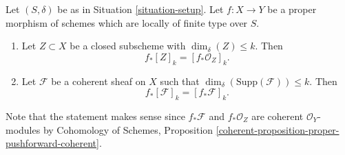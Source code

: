 \begin{lemma}
\label{lemma-cycle-push-sheaf}
Let $(S, \delta)$ be as in Situation \ref{situation-setup}.
Let $f : X \to Y$ be a proper morphism of schemes which are
locally of finite type over $S$.
\begin{enumerate}
\item Let $Z \subset X$ be a closed subscheme with $\dim_\delta(Z) \leq k$.
Then
$$
f_*[Z]_k = [f_*{\mathcal O}_Z]_k.
$$
\item Let $\mathcal{F}$ be a coherent sheaf on $X$ such that
$\dim_\delta(\text{Supp}(\mathcal{F})) \leq k$. Then
$$
f_*[\mathcal{F}]_k = [f_*{\mathcal F}]_k.
$$
\end{enumerate}
Note that the statement makes sense since $f_*\mathcal{F}$ and
$f_*\mathcal{O}_Z$ are coherent $\mathcal{O}_Y$-modules by
Cohomology of Schemes, Proposition
\ref{coherent-proposition-proper-pushforward-coherent}.
\end{lemma}

